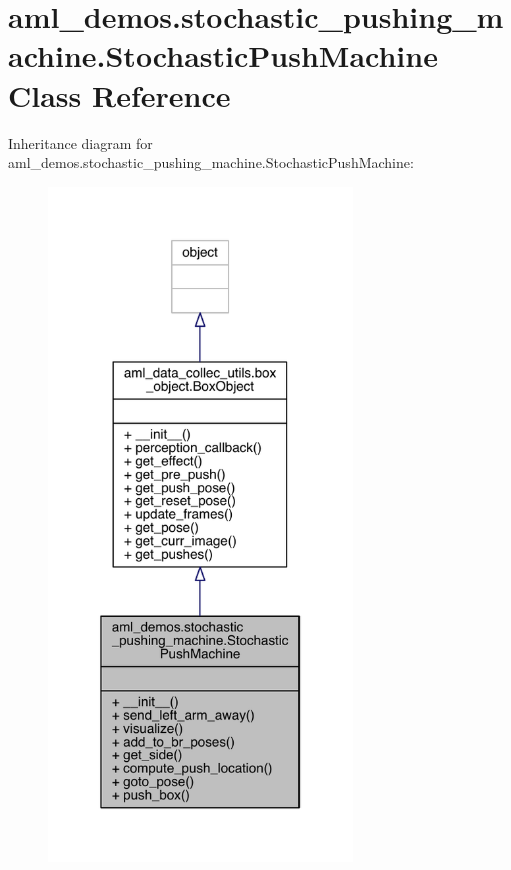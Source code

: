 \hypertarget{classaml__demos_1_1stochastic__pushing__machine_1_1_stochastic_push_machine}{}\section{aml\+\_\+demos.\+stochastic\+\_\+pushing\+\_\+machine.\+Stochastic\+Push\+Machine Class Reference}
\label{classaml__demos_1_1stochastic__pushing__machine_1_1_stochastic_push_machine}


Inheritance diagram for aml\+\_\+demos.\+stochastic\+\_\+pushing\+\_\+machine.\+Stochastic\+Push\+Machine\+:
\nopagebreak
\begin{figure}[H]
\begin{center}
\leavevmode
\includegraphics[width=229pt]{classaml__demos_1_1stochastic__pushing__machine_1_1_stochastic_push_machine__inherit__graph}
\end{center}
\end{figure}


